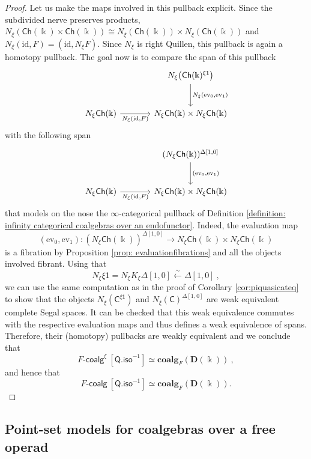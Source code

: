 \documentclass{proc-l}
\theoremstyle{plain}
\theoremstyle{definition}
\theoremstyle{remark}
\newcommand{\kk}{\Bbbk}
\begin{document}
\begin{proof}
Let us make the maps involved in this pullback explicit. Since the subdivided nerve preserves products, $N_{\xi}(\mathsf{Ch}(\kk)\times\mathsf{Ch}(\kk)) \cong N_{\xi}(\mathsf{Ch}(\kk)) \times N_{\xi}(\mathsf{Ch}(\kk))$ and $N_{\xi}(\mathrm{id},F)=(\mathrm{id},N_{\xi}F)$. Since $N_\xi$ is right Quillen, this pullback is again a homotopy pullback. The goal now is to compare the span of this pullback
\[
\begin{tikzcd}[row sep=large, column sep=large]
& N_{\xi}\bigl(\mathsf{Ch}(\kk)^{\xi\mathsf{1}}\bigr)
\arrow[d, "{N_{\xi}(\mathrm{ev}_0,\mathrm{ev}_1)}"] \\
N_{\xi}\mathsf{Ch}(\kk)
\arrow[r, "{N_{\xi}(\mathrm{id},F)}"']
& N_{\xi}\mathsf{Ch}(\kk)\times N_{\xi}\mathsf{Ch}(\kk)
\end{tikzcd}
\]
with the following span
\[
\begin{tikzcd}[row sep=large, column sep=large]
& (N_{\xi}\mathsf{Ch}(\kk))^{\Delta[1,0]}
\arrow[d, "{(\mathrm{ev}_0,\mathrm{ev}_1)}"] \\
N_{\xi}\mathsf{Ch}(\kk)
\arrow[r, "{N_{\xi}(\mathrm{id},F)}"']
& N_{\xi}\mathsf{Ch}(\kk)\times N_{\xi}\mathsf{Ch}(\kk)
\end{tikzcd}
\]
that models on the nose the $\infty$-categorical pullback of Definition \ref{definition: infinity categorical coalgebras over an endofunctor}. Indeed, the evaluation map
\[
(\mathrm{ev}_0,\mathrm{ev}_1): (N_{\xi}\mathsf{Ch}(\kk))^{\Delta[1,0]}\longrightarrow N_{\xi}\mathsf{Ch}(\kk)\times N_{\xi}\mathsf{Ch}(\kk)
\]
is a fibration by Proposition \ref{prop: evaluationfibrations} and all the objects involved fibrant. Using that
\[
N_{\xi}\xi\mathsf{1}=N_{\xi}K_{\xi}\Delta[1,0]\stackrel{\sim}{\leftarrow}\Delta[1,0]~,
\]
we can use the same computation as in the proof of Corollary \ref{cor:piquasicateq} to show that the objects $N_{\xi}(\mathsf{C}^{\xi\mathsf{1}})$ and $N_{\xi}(\mathsf{C})^{\Delta[1,0]}$ are weak equivalent complete Segal spaces. It can be checked that this weak equivalence commutes with the respective evaluation maps and thus defines a weak equivalence of spans. Therefore, their (homotopy) pullbacks are weakly equivalent and we conclude that
\[
F\text{-}\mathsf{coalg}^{\xi}~[\mathsf{Q.iso}^{-1}] \simeq \mathbf{coalg}_{F}(\mathbf{D}(\kk))~,
\]
and hence that
\[
F\text{-}\mathsf{coalg}~[\mathsf{Q.iso}^{-1}] \simeq \mathbf{coalg}_{F}(\mathbf{D}(\kk)).
\]
\end{proof}

\subsection{Point-set models for coalgebras over a free operad}%
\label{Section:4.2}
\end{document}
